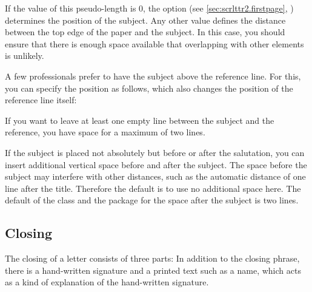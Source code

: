 \begin{Declaration}
\end{Declaration}
%
If the value of this pseudo-length is 0, the
%
 option (see
\autoref{sec:scrlttr2.firstpage}, )
determines the position of the subject. Any other value defines the distance
between the top edge of the paper and the subject. In this
case, you should ensure that there is enough space available
that overlapping with other elements is unlikely.
\begin{Example}
  A few professionals prefer to have the subject above the reference line. For
  this, you can specify the position as follows, which also changes the
  position of the reference line itself:
  If you want to leave at least one empty line between the subject and the
  reference, you have space for a maximum of two lines.
\end{Example}
\EndIndexGroup


\begin{Declaration}
\end{Declaration}
%
If the subject is placed not absolutely but before or after the salutation,
you can insert additional vertical space before and after the subject. The
space before the subject may interfere with other distances, such as the
automatic distance of one line after the title. Therefore the default is to
use no additional space here. The default of the class and the package for the
space after the subject is two lines.%
\EndIndexGroup
%
\EndIndexGroup


\subsection{Closing}
\BeginIndexGroup
{}

The closing of a letter consists of three parts: In addition to the closing
phrase, there is a hand-written signature and a printed text such as a name,
which acts as a kind of explanation of the hand-written signature.

